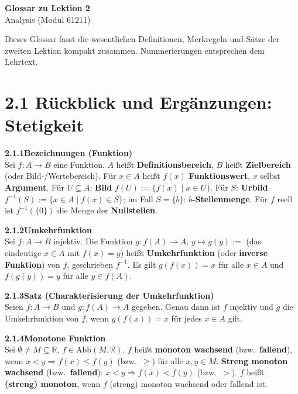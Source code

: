 \documentclass[a4paper,12pt]{article}
\newcommand{\gentry}[3]{%
  \noindent\textbf{#1\quad #2}\nopagebreak\\[0.2em]
  #3\par\smallskip
}
\begin{document}
\begin{center}
  {\LARGE\bfseries Glossar zu Lektion 2}\\[0.5em]
  {\large Analysis (Modul 61211)}
\end{center}

\vspace{1em}

Dieses Glossar fasst die wesentlichen Definitionen, Merkregeln und Sätze der
zweiten Lektion kompakt zusammen. Nummerierungen entsprechen dem Lehrtext.

\section*{2.1 \quad Rückblick und Ergänzungen: Stetigkeit}

\gentry{2.1.1}{Bezeichnungen (Funktion)}{%
  Sei $f: A \to B$ eine Funktion. $A$ heißt \textbf{Definitionsbereich}, $B$
  heißt \textbf{Zielbereich} (oder Bild-/Wertebereich). Für $x \in A$ heißt
  $f(x)$ \textbf{Funktionswert}, $x$ selbst \textbf{Argument}.
  Für $U \subseteq A$: \textbf{Bild} $f(U) := \{f(x) \mid x \in U\}$.
  Für $S$: \textbf{Urbild} $f^{-1}(S) := \{x \in A \mid f(x) \in S\}$;
  im Fall $S = \{b\}$: \textbf{$b$-Stellenmenge}. Für $f$ reell ist $f^{-1}(\{0\})$
  die Menge der \textbf{Nullstellen}.
}

\gentry{2.1.2}{Umkehrfunktion}{%
  Sei $f: A \to B$ injektiv. Die Funktion $g: f(A) \to A$, $y \mapsto g(y) :=$
  (das eindeutige $x \in A$ mit $f(x) = y$) heißt \textbf{Umkehrfunktion} (oder
  \textbf{inverse Funktion}) von $f$, geschrieben $f^{-1}$.
  Es gilt $g(f(x)) = x$ für alle $x \in A$ und $f(g(y)) = y$ für alle $y \in f(A)$.
}

\gentry{2.1.3}{Satz (Charakterisierung der Umkehrfunktion)}{%
  Seien $f: A \to B$ und $g: f(A) \to A$ gegeben. Genau dann ist $f$ injektiv
  und $g$ die Umkehrfunktion von $f$, wenn $g(f(x)) = x$ für jedes $x \in A$ gilt.
}

\gentry{2.1.4}{Monotone Funktion}{%
  Sei $\emptyset \neq M \subseteq \mathbb{R}$, $f \in \mathrm{Abb}(M, \mathbb{R})$.
  $f$ heißt \textbf{monoton wachsend} (bzw.\ \textbf{fallend}), wenn
  $x < y \Rightarrow f(x) \leq f(y)$ (bzw.\ $\geq$) für alle $x, y \in M$.
  \textbf{Streng monoton wachsend} (bzw.\ \textbf{fallend}): $x < y \Rightarrow f(x) < f(y)$
  (bzw.\ $>$). $f$ heißt \textbf{(streng) monoton}, wenn $f$ (streng) monoton
  wachsend oder fallend ist.
}
\end{document}
